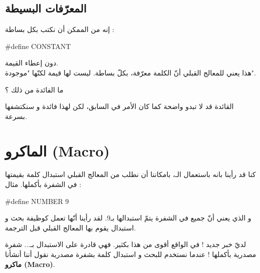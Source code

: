 \subsection{المعرّفات البسيطة}
إنه من الممكن أن نكتب بكل بساطة :
\begin{Csource}
#define CONSTANT
\end{Csource}
دون إعطاء القيمة.\\
هذا يعني للمعالج القبلي أنّ الكلمة
معرّفة، بكلّ بساطة. ليست لها قيمة لكنّها "موجودة".
\begin{question}
  ما الفائدة من ذلك ؟
\end{question}
القائدة قد لا تبدو واضحة كما كان الأمر في السابق، لكن لهذا فائدة و سنكتشفها بسرعة.

\section{الماكرو (\textenglish{Macro})}
كنا قد رأينا بانه باستعمال الـ،
بامكاننا أن نطلب من المعالج القبلي استبدال كلمة بقيمتها في الشفرة بأكملها. مثال :
\begin{Csource}
#define NUMBER 9
\end{Csource}
و الذي يعني أنّ جميع
في الشفرة يتمّ استبدالها بـ9. لقد رأينا أنّها تعمل كوظيفة بحث و استبدال يقوم بها المعالج القبلي قبل الترجمة.

لديّ خبر جديد ! في الواقع
أقوى من هذا بكثير. فهي قادرة على الاستبدال بـ... شفرة مصدرية بأكملها ! عندما نستخدم
للبحث و استبدال كلمة بشفرة مصدرية نقول أننا أنشأنا
\textbf{ماكرو
(\textenglish{Macro})}.
